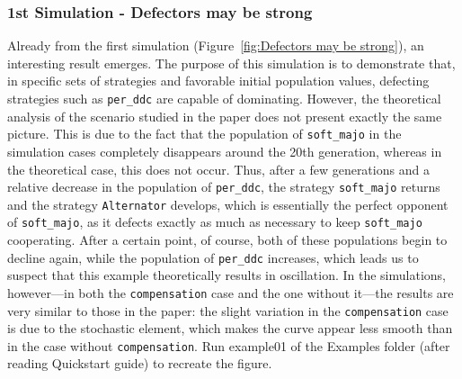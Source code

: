 \documentclass[12pt]{article}
\begin{document}
\subsubsection{1st Simulation - Defectors may be strong}
Already from the first simulation (Figure~\ref{fig:Defectors may be strong}), an interesting result emerges. The purpose of this simulation is to demonstrate that, in specific sets of strategies and favorable initial population values, defecting strategies such as \texttt{per\_ddc} are capable of dominating. However, the theoretical analysis of the scenario studied in the paper does not present exactly the same picture. This is due to the fact that the population of \texttt{soft\_majo} in the simulation cases completely disappears around the 20th generation, whereas in the theoretical case, this does not occur. Thus, after a few generations and a relative decrease in the population of \texttt{per\_ddc}, the strategy \texttt{soft\_majo} returns and the strategy \texttt{Alternator} develops, which is essentially the perfect opponent of \texttt{soft\_majo}, as it defects exactly as much as necessary to keep \texttt{soft\_majo} cooperating. After a certain point, of course, both of these populations begin to decline again, while the population of \texttt{per\_ddc} increases, which leads us to suspect that this example theoretically results in oscillation. In the simulations, however---in both the \texttt{compensation} case and the one without it---the results are very similar to those in the paper: the slight variation in the \texttt{compensation} case is due to the stochastic element, which makes the curve appear less smooth than in the case without \texttt{compensation}. Run example01 of the Examples folder (after reading Quickstart guide) to recreate the figure.
\end{document}

